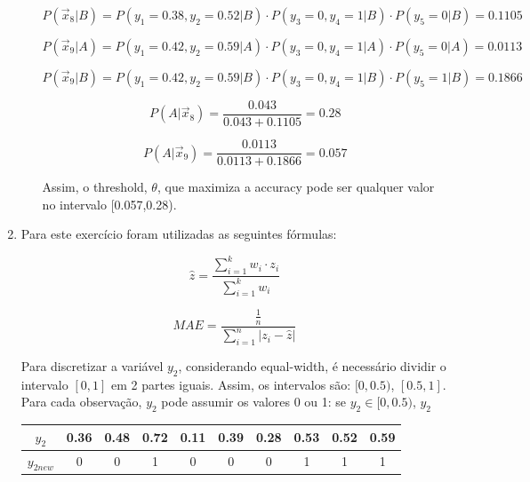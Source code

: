 \documentclass[a4paper,12pt]{article} %
\begin{document}
\begin{enumerate}
\begin{enumerate}
\begin{equation*}
    P(\vec{x}_8|B) = P(y_1=0.38,y_2=0.52|B) \cdot P(y_3=0,y_4=1|B) \cdot P(y_5=0|B) = 0.1105
\end{equation*}

\begin{equation*}
    P(\vec{x}_9|A) = P(y_1=0.42,y_2=0.59|A) \cdot P(y_3=0,y_4=1|A) \cdot P(y_5=0|A) = 0.0113
\end{equation*}


\begin{equation*}
    P(\vec{x}_9|B) = P(y_1=0.42,y_2=0.59|B) \cdot P(y_3=0,y_4=1|B) \cdot P(y_5=1|B) = 0.1866
\end{equation*}

\begin{equation*}
    P(A|\vec{x}_8) = \frac{0.043}{0.043+0.1105} = 0.28
\end{equation*}

\begin{equation*}
    P(A|\vec{x}_9) = \frac{0.0113}{0.0113+0.1866} = 0.057
\end{equation*}

Assim, o threshold, $\theta$, que maximiza a accuracy pode ser qualquer valor no intervalo [0.057,0.28).

\end{enumerate}

\item
Para este exercício foram utilizadas as seguintes fórmulas:

\begin{equation}
    \hat{z} = \frac{\sum_{i=1}^{k} w_i \cdot z_{i}}{\sum_{i=1}^{k} w_i}
\end{equation}

\begin{equation}
    MAE = \frac{\frac{1}{n}}{\sum_{i=1}^{n} |z_i - \hat{z}|}
\end{equation}

Para discretizar a variável $y_2$, considerando equal-width, é necessário dividir o intervalo $[0,1]$ em 2 partes iguais. 
Assim, os intervalos são: $[0,0.5)$, $[0.5,1]$. \\

Para cada observação, $y_2$ pode assumir os valores 0 ou 1: se $y_2 \in [0,0.5)$, $y_2$  \\

\begin{table}[H]
    \centering
    \begin{tabular}{c|ccccccccc}
    $y_2$     & 0.36 & 0.48 & 0.72 & 0.11 & 0.39 & 0.28 & 0.53 & 0.52 & 0.59 \\ \hline
    $y_{2 new}$ & 0    & 0    & 1    & 0    & 0    & 0    & 1    & 1    & 1   
    \end{tabular}
\end{table}


\end{enumerate}
\end{document}
